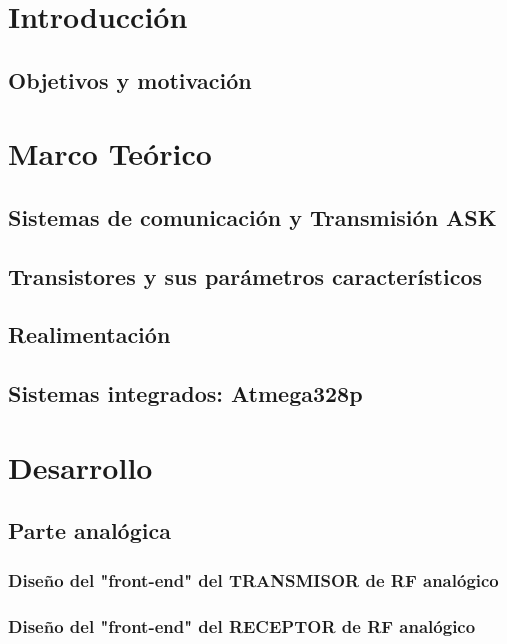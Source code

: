\documentclass[11pt, a4paper]{article} %
\begin{document}
\newpage


\section{Introducción}
   \label{sec:intro}
   
   \subsection{Objetivos y motivaci\'on}
   
\section{Marco Teórico}
   \subsection{Sistemas de comunicaci\'on y Transmisión ASK}
   
   \subsection{Transistores y sus parámetros característicos}
   \label{sec:teo_transistor}
   
   \subsection{Realimentaci\'on}
   
   \subsection{Sistemas integrados: Atmega328p}
   
\section{Desarrollo}
   
   \subsection{Parte anal\'ogica}
   
   \subsubsection{Diseño del "front-end" del TRANSMISOR de RF anal\'ogico}
   
   \subsubsection{Diseño del "front-end" del RECEPTOR de RF anal\'ogico}
   
\end{document}
